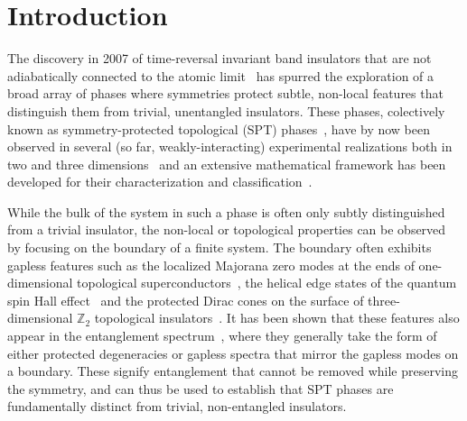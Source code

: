 
\section{Introduction}

The discovery in 2007 of time-reversal invariant band insulators that are not adiabatically connected to the atomic limit~\cite{...}
has spurred the exploration of a broad array of phases where symmetries protect subtle, non-local features that distinguish
them from trivial, unentangled insulators. These phases, colectively known as symmetry-protected topological (SPT) phases~\cite{...}, have
by now been observed in several (so far, weakly-interacting) experimental realizations both in two and three dimensions~\cite{somereview} and an extensive
mathematical framework has been developed for their characterization and classification~\cite{wen...}.

While the bulk of the system in such a phase is often only subtly distinguished from a trivial insulator, the non-local or topological properties can be observed by focusing on the boundary of a finite system.  The boundary often exhibits gapless features such as the localized
Majorana zero modes at the ends of one-dimensional topological superconductors~\cite{kitaev2001},
the helical edge states of the quantum spin Hall effect~\cite{...} and the protected Dirac cones on the surface of three-dimensional
$\mathbb{Z}_2$ topological insulators~\cite{...}.
It has been shown that these features also appear in the entanglement spectrum~\cite{li2008}, where they generally take the form
of either protected degeneracies or gapless spectra that mirror the gapless modes on a boundary.
These signify entanglement that cannot be removed while preserving the symmetry, and can thus be used to establish
that SPT phases are fundamentally distinct from trivial, non-entangled insulators.

